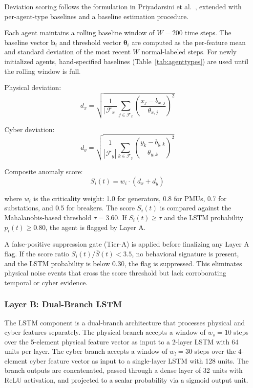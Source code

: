 Deviation scoring follows the formulation in Priyadarsini et al.~\cite{priyadarsini2025}, extended
with per-agent-type baselines and a baseline estimation procedure.

Each agent maintains a rolling baseline window of $W = 200$ time steps. The baseline vector
$\mathbf{b}_i$ and threshold vector $\boldsymbol{\theta}_i$ are computed as the per-feature mean
and standard deviation of the most recent $W$ normal-labeled steps. For newly initialized agents,
hand-specified baselines (Table~\ref{tab:agenttypes}) are used until the rolling window is full.

Physical deviation:
\begin{equation}
d_x = \sqrt{\frac{1}{|\mathcal{F}_x|} \sum_{j \in \mathcal{F}_x}
\left(\frac{x_j - b_{x,j}}{\theta_{x,j}}\right)^2}
\end{equation}

Cyber deviation:
\begin{equation}
d_y = \sqrt{\frac{1}{|\mathcal{F}_y|} \sum_{k \in \mathcal{F}_y}
\left(\frac{y_k - b_{y,k}}{\theta_{y,k}}\right)^2}
\end{equation}

Composite anomaly score:
\begin{equation}
S_i(t) = w_i \cdot (d_x + d_y)
\label{eq:score}
\end{equation}

where $w_i$ is the criticality weight: 1.0 for generators, 0.8 for PMUs, 0.7 for substations, and
0.5 for breakers. The score $S_i(t)$ is compared against the Mahalanobis-based threshold
$\tau = 3.60$. If $S_i(t) \geq \tau$ and the LSTM probability $p_i(t) \geq 0.80$, the agent is
flagged by Layer A.

A false-positive suppression gate (Tier-A) is applied before finalizing any Layer A flag. If the
score ratio $S_i(t) / \bar{S}(t) < 3.5$, no behavioral signature is present, and the LSTM
probability is below 0.30, the flag is suppressed. This eliminates physical noise events that cross
the score threshold but lack corroborating temporal or cyber evidence.

\subsubsection{Layer B: Dual-Branch LSTM}
\label{sec:layerb}

The LSTM component is a dual-branch architecture that processes physical and cyber features
separately. The physical branch accepts a window of $w_s = 10$ steps over the 5-element physical
feature vector as input to a 2-layer LSTM with 64 units per layer. The cyber branch accepts a
window of $w_l = 30$ steps over the 4-element cyber feature vector as input to a single-layer LSTM
with 128 units. The branch outputs are concatenated, passed through a dense layer of 32 units with
ReLU activation, and projected to a scalar probability via a sigmoid output unit.


